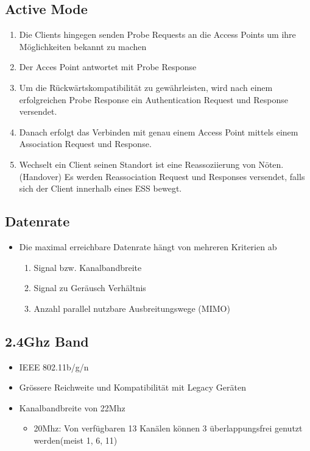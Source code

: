 \subsection{Active Mode}
\begin{enumerate}
	\item Die Clients hingegen senden Probe Requests an die Access Points um ihre Möglichkeiten bekannt zu machen
	\item Der Acces Point antwortet mit Probe Response
	\item Um die Rückwärtskompatibilität zu gewährleisten, wird nach einem erfolgreichen Probe Response ein Authentication Request und Response versendet.
	\item Danach erfolgt das Verbinden mit genau einem Access Point mittels einem Association Request und Response.
	\item Wechselt ein Client seinen Standort ist eine Reassoziierung von Nöten. (Handover) Es werden Reassociation Request und Responses versendet, falls sich der Client innerhalb eines ESS bewegt.
\end{enumerate}

\subsection{Datenrate}
\begin{itemize}
	\item Die maximal erreichbare Datenrate hängt von mehreren Kriterien ab
	\begin{enumerate}
		\item Signal bzw. Kanalbandbreite
		\item Signal zu Geräusch Verhältnis
		\item Anzahl parallel nutzbare Ausbreitungswege (MIMO)
	\end{enumerate}
\end{itemize}

\subsection{2.4Ghz Band}
\begin{itemize}
	\item IEEE 802.11b/g/n
	\item Grössere Reichweite und Kompatibilität mit Legacy Geräten
	\item Kanalbandbreite von 22Mhz
	\begin{itemize}
		\item 20Mhz: Von verfügbaren 13 Kanälen können 3 überlappungsfrei genutzt werden(meist 1, 6, 11)
	\end{itemize}
\end{itemize}


